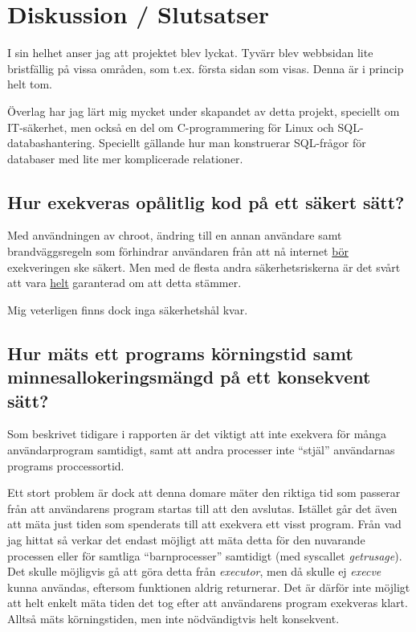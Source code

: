 \documentclass{article}
\begin{document}
\section{Diskussion / Slutsatser}

I sin helhet anser jag att projektet blev lyckat. Tyvärr blev webbsidan lite
bristfällig på vissa områden, som t.ex. första sidan som visas. Denna är i
princip helt tom.

Överlag har jag lärt mig mycket under skapandet av detta projekt, speciellt om
IT-säkerhet, men också en del om C-programmering för Linux och
SQL-databashantering. Speciellt gällande hur man konstruerar SQL-frågor för
databaser med lite mer komplicerade relationer.

\subsection{Hur exekveras opålitlig kod på ett säkert sätt?}

Med användningen av chroot, ändring till en annan användare samt
brandväggsregeln som förhindrar användaren från att nå internet \underline{bör}
exekveringen ske säkert. Men med de flesta andra säkerhetsriskerna är det svårt
att vara \underline{helt} garanterad om att detta stämmer.

Mig veterligen finns dock inga säkerhetshål kvar.

\subsection{Hur mäts ett programs körningstid samt minnesallokeringsmängd på
	ett konsekvent sätt?}

Som beskrivet tidigare i rapporten är det viktigt att inte exekvera för många
användarprogram samtidigt, samt att andra processer inte ``stjäl'' användarnas
programs proccessortid.

Ett stort problem är dock att denna domare mäter den riktiga tid som passerar
från att användarens program startas till att den avslutas. Istället går det
även att mäta just tiden som spenderats till att exekvera ett visst program.
Från vad jag hittat så verkar det endast möjligt att mäta detta för den
nuvarande processen eller för samtliga ``barnprocesser'' samtidigt (med
syscallet \textit{getrusage}). Det skulle möjligvis gå att göra detta från
\textit{executor}, men då skulle ej \textit{execve} kunna användas, eftersom
funktionen aldrig returnerar. Det är därför inte möjligt att helt enkelt mäta
tiden det tog efter att användarens program exekveras klart. Alltså mäts
körningstiden, men inte nödvändigtvis helt konsekvent.
\end{document}
